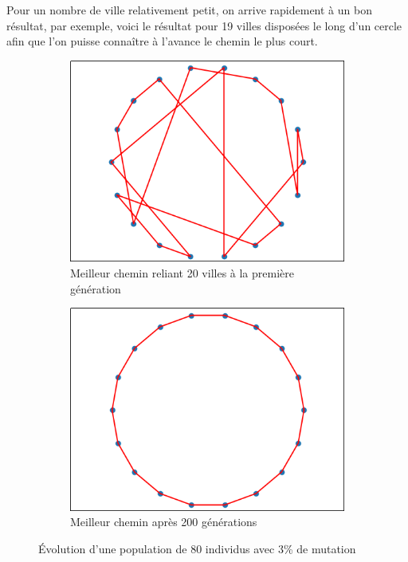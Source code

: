 \documentclass[12pt]{article}
\begin{document}
Pour un nombre de ville relativement petit, on arrive rapidement à un bon résultat, par exemple, voici le résultat pour 19 villes disposées
le long d'un cercle afin que l'on puisse connaître à l'avance le chemin le plus court.

\begin{figure}[h]
    \begin{subfigure}{.5\textwidth}
        \includegraphics[width=.9\linewidth]{./gen1.png}
        \caption{Meilleur chemin reliant 20 villes à la première génération}
    \end{subfigure}
    \begin{subfigure}{.5\textwidth}
        \includegraphics[width=.9\linewidth]{./gen200.png}
        \caption{Meilleur chemin après 200 générations
        }
    \end{subfigure}
    \caption{Évolution d'une population de 80 individus avec 3\% de mutation}
\end{figure}
\end{document}
